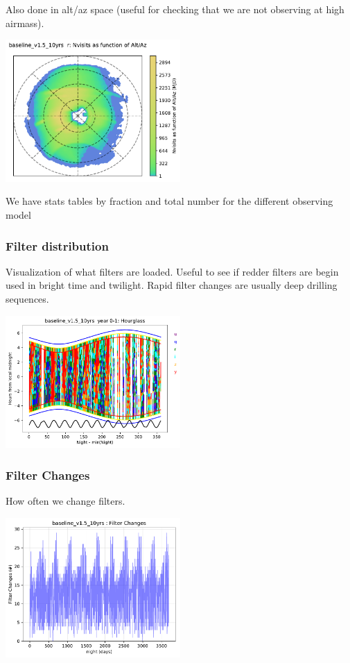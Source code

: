{Also done in alt/az space (useful for checking that we are not observing at high airmass).

\includegraphics[width=0.5\textwidth]{metric_summary/baseline_v1.5_10yrs/baseline_v1_5_10yrs_Nvisits_as_function_of_Alt_Az_r_HEAL_SkyMap.pdf}

We have stats tables by fraction and total number for the different observing model

\subsubsection{Filter distribution}

Visualization of what filters are loaded. Useful to see if redder filters are begin used in bright time and twilight. Rapid filter changes are usually deep drilling sequences.

\includegraphics[width=0.5\textwidth]{metric_summary/baseline_v1.5_10yrs/baseline_v1_5_10yrs_Hourglass_year_0-1_HOUR_Hourglass.pdf}

\subsubsection{Filter Changes}

How often we change filters.

\includegraphics[width=0.5\textwidth]{metric_summary/baseline_v1.5_10yrs/baseline_v1_5_10yrs_Filter_Changes_ONED_BinnedData.pdf}

}
